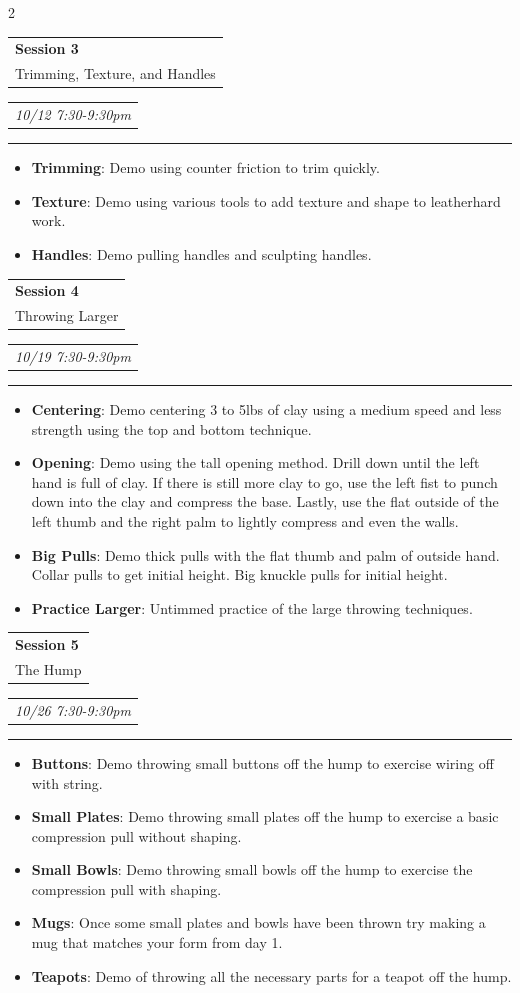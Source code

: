 \documentclass[9pt]{extarticle}
\makeatletter
\newcommand{\split}[3]{
\noindent\begin{tabular}[t]{@{}l}
    \textbf{#1} \\ #2
\end{tabular}
\hfill
\begin{tabular}[t]{l@{}}
    \\
    \textit{#3}
\end{tabular}
\noindent\rule{\columnwidth}{0.5pt}
}
\makeatother
\begin{document}
\begin{multicols}{2}
	\split{Session 3}{Trimming, Texture, and Handles}{10/12 7:30-9:30pm}
	\begin{itemize}
		\item \textbf{Trimming}: Demo using counter friction to trim quickly.
		\item \textbf{Texture}: Demo using various tools to add texture and shape to
		      leatherhard work.
		\item \textbf{Handles}: Demo pulling handles and sculpting handles.
	\end{itemize}

	\columnbreak

	\split{Session 4}{Throwing Larger}{10/19 7:30-9:30pm}
	\begin{itemize}
		\item \textbf{Centering}: Demo centering 3 to 5lbs of clay using a medium speed
		      and less strength using the top and bottom technique.
		\item \textbf{Opening}: Demo using the tall opening method. Drill down until the
		      left hand is full of clay. If there is still more clay to go, use the left
		      fist to punch down into the clay and compress the base. Lastly, use the
		      flat outside of the left thumb and the right palm to lightly compress and
		      even the walls.
		\item \textbf{Big Pulls}: Demo thick pulls with the flat thumb and palm of
		      outside hand. Collar pulls to get initial height. Big knuckle pulls for
		      initial height.
		\item \textbf{Practice Larger}: Untimmed practice of the large throwing
		      techniques.
	\end{itemize}

	\split{Session 5}{The Hump}{10/26 7:30-9:30pm}
	\begin{itemize}
		\item \textbf{Buttons}: Demo throwing small buttons off the hump to exercise
		      wiring off with string.
		\item \textbf{Small Plates}: Demo throwing small plates off the hump to
		      exercise a basic compression pull without shaping.
		\item \textbf{Small Bowls}: Demo throwing small bowls off the hump to
		      exercise the compression pull with shaping.
		\item \textbf{Mugs}: Once some small plates and bowls have been thrown try
		      making a mug that matches your form from day 1.
		\item \textbf{Teapots}: Demo of throwing all the necessary parts for a
		      teapot off the hump.
	\end{itemize}


\end{multicols}
\end{document}
